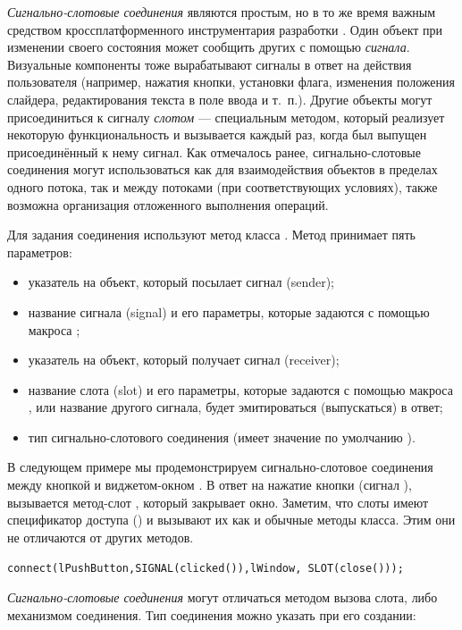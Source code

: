 \emph{Сигнально-слотовые соединения} являются простым, но в то же время важным
средством кроссплатформенного инструментария разработки .  Один объект при изменении своего состояния может сообщить
других с помощью \emph{сигнала}. Визуальные компоненты тоже вырабатывают сигналы в ответ на действия
пользователя (например, нажатия  кнопки, установки флага, изменения положения слайдера, редактирования текста в поле
ввода  и т.~п.). Другие объекты могут присоединиться к сигналу \emph{слотом} --- специальным методом,
который реализует некоторую функциональность  и вызывается каждый раз, когда был выпущен присоединённый к нему сигнал.
Как отмечалось ранее, сигнально-слотовые соединения могут использоваться как для взаимодействия объектов в пределах
одного потока, так и между потоками (при соответствующих условиях), также возможна организация отложенного выполнения
операций. 

Для задания соединения используют метод  класса . Метод принимает пять параметров:

\begin{itemize}
\item указатель на объект, который посылает сигнал (sender);
\item название сигнала (signal) и его параметры, которые задаются с помощью макроса ;
\item указатель на объект, который получает сигнал (receiver);
\item название слота (slot) и его параметры, которые задаются с помощью макроса , или название другого
сигнала, будет эмитироваться (выпускаться) в ответ;
\item тип сигнально-слотового соединения (имеет значение по умолчанию ).
\end{itemize}
В следующем примере мы продемонстрируем сигнально-слотовое соединения между кнопкой  и
виджетом-окном . В ответ на нажатие кнопки (сигнал ), вызывается
метод-слот , который закрывает окно. Заметим, что слоты имеют спецификатор доступа
() и вызывают их как и обычные методы класса. Этим они не отличаются от других
методов.

\lstinline!connect(lPushButton,SIGNAL(clicked()),lWindow, SLOT(close()));!

\emph{Сигнально-слотовые соединения} могут отличаться методом вызова слота, либо механизмом соединения.
Тип соединения можно указать при его создании:


